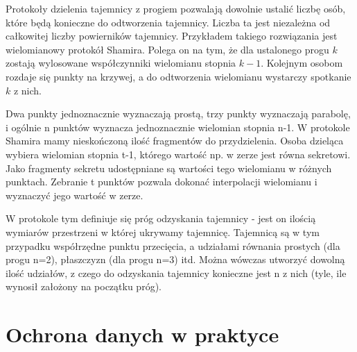 \documentclass[answers,11pt]{exam}
\begin{document}
\begin{questions}
\begin{solution}
Protokoły dzielenia tajemnicy z progiem pozwalają dowolnie ustalić liczbę osób, które będą konieczne do odtworzenia tajemnicy. Liczba ta jest niezależna od całkowitej liczby powierników tajemnicy. Przykładem takiego rozwiązania jest wielomianowy protokół Shamira. Polega on na tym, że dla ustalonego progu $k$ zostają wylosowane współczynniki wielomianu stopnia $k-1$. Kolejnym osobom rozdaje się punkty na krzywej, a do odtworzenia wielomianu wystarczy spotkanie $k$ z nich.
\end{solution}

\begin{solution}
Dwa punkty jednoznacznie wyznaczają  prostą, trzy punkty wyznaczają
parabolę, i ogólnie n punktów wyznacza jednoznacznie wielomian stopnia
n-1. W protokole Shamira mamy nieskończoną ilość fragmentów do
przydzielenia. Osoba dzieląca wybiera wielomian stopnia t-1, którego
wartość np. w zerze jest równa sekretowi. Jako fragmenty sekretu
udostępniane są wartości tego wielomianu w różnych punktach. Zebranie
t punktów pozwala dokonać interpolacji wielomianu i wyznaczyć jego
wartość w zerze.
\end{solution}

\begin{solution}
W protokole tym definiuje się próg odzyskania tajemnicy - jest on ilością wymiarów przestrzeni w której ukrywamy tajemnicę. Tajemnicą są w tym przypadku współrzędne punktu przecięcia, a udziałami równania prostych (dla progu n=2), płaszczyzn (dla progu n=3) itd. Można wówczas utworzyć dowolną ilość udziałów, z czego do odzyskania tajemnicy konieczne jest n z nich (tyle, ile wynosił założony na początku próg).
\end{solution}

\end{questions}

\section{Ochrona danych w praktyce}
\end{document}
